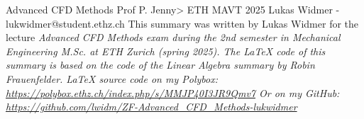 













\raggedbottom
\raggedright
\raggedcolumns
\begin{multicols*}{4}

	\DocumentInfo
	{Advanced CFD Methods} %
	{Prof P. Jenny> \newline
		ETH MAVT 2025 \newline
		Lukas Widmer - lukwidmer@student.ethz.ch} %
	{This summary was written by Lukas Widmer for the lecture \it{Advanced CFD Methods} exam during the 2nd semester in Mechanical Engineering M.Sc. at ETH Zurich (spring 2025). \vspace{1mm}\newline
		The LaTeX code of this summary is based on the code of the Linear Algebra summary by Robin Frauenfelder. \vspace{1mm} \newline
		\LaTeX\hspace{1pt} source code on my Polybox: \newline
		\tiny \url{https://polybox.ethz.ch/index.php/s/MMJP40I3JR9Qmv7} \small \newline
		Or on my GitHub: \newline
		\tiny \url{https://github.com/lwidm/ZF-Advanced_CFD_Methods-lukwidmer}\small
	}


	





\end{multicols*}



